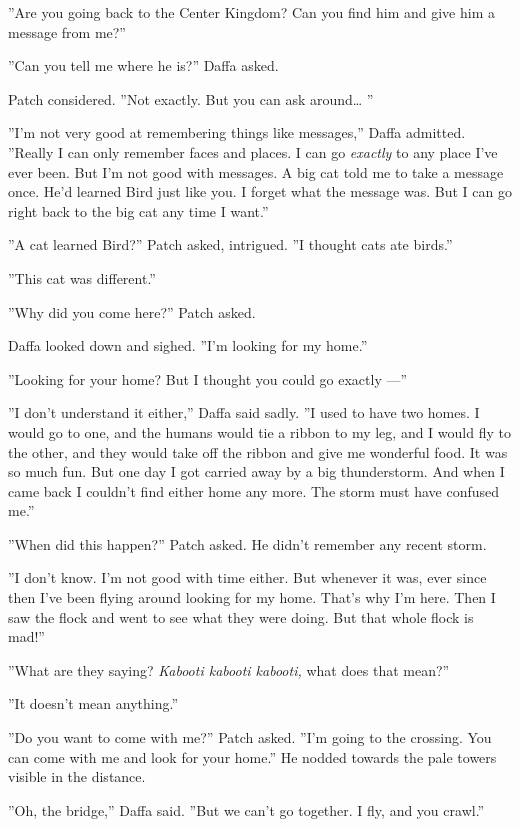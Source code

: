 \documentclass[12pt]{book}
\begin{document}
''Are you going back to the Center Kingdom? Can you find him and give
him a message from me?''

''Can you tell me where he is?'' Daffa asked.

Patch considered. ''Not exactly. But you can ask around\ldots{} ''

''I'm not very good at remembering things like messages,'' Daffa
admitted. ''Really I can only remember faces and places. I can go
\textit{exactly} to any place I've ever been. But I'm not good with
messages. A big cat told me to take a message once. He'd learned Bird
just like you. I forget what the message was. But I can go right back
to the big cat any time I want.''

''A cat learned Bird?'' Patch asked, intrigued. ''I thought cats ate
birds.''

''This cat was different.''

''Why did you come here?'' Patch asked.

Daffa looked down and sighed. ''I'm looking for my home.''

''Looking for your home? But I thought you could go exactly ---''

''I don't understand it either,'' Daffa said sadly. ''I used to have
two homes. I would go to one, and the humans would tie a ribbon to my
leg, and I would fly to the other, and they would take off the ribbon
and give me wonderful food. It was so much fun. But one day I got
carried away by a big thunderstorm. And when I came back I couldn't
find either home any more. The storm must have confused me.''

''When did this happen?'' Patch asked. He didn't remember any recent
storm.

''I don't know. I'm not good with time either. But whenever it was,
ever since then I've been flying around looking for my home. That's
why I'm here. Then I saw the flock and went to see what they were
doing. But that whole flock is mad!''

''What are they saying? \textit{Kabooti kabooti kabooti,} what does
that mean?''

''It doesn't mean anything.''

''Do you want to come with me?'' Patch asked. ''I'm going to the
crossing. You can come with me and look for your home.'' He nodded
towards the pale towers visible in the distance.

''Oh, the bridge,'' Daffa said. ''But we can't go together. I fly, and
you crawl.''
\end{document}

